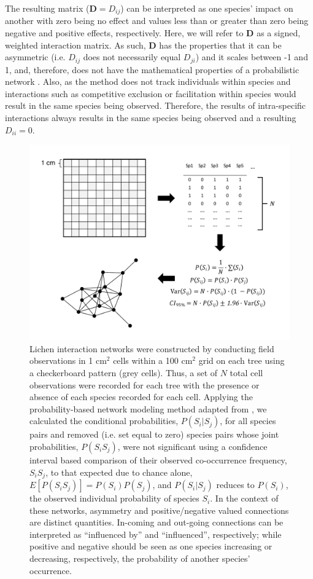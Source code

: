 \documentclass[11pt,twocolumn,twoside,lineno]{pnas-new}
\begin{document}
{The resulting matrix ($\mathbf{D} = D_{ij}$) can be interpreted as one
species' impact on another with zero being no effect and values less
than or greater than zero being negative and positive effects,
respectively. Here, we will refer to $\mathbf{D}$ as a signed,
weighted interaction matrix. As such, $\mathbf{D}$ has the properties
that it can be asymmetric (i.e. $D_{ij}$ does not necessarily equal
$D_{ji}$) and it scales between -1 and 1, and, therefore, does not
have the mathematical properties of a probabilistic network
\cite{Poisot2015}. Also, as the method does not track individuals
within species and interactions such as competitive exclusion or
facilitation within species would result in the same species being
observed. Therefore, the results of intra-specific interactions always
results in the same species being observed and a resulting $D_{ii} =
0$.

\begin{figure}[ht]
\centering
\includegraphics[width=\linewidth]{lcn_araujo_method.pdf}
\caption{Lichen interaction networks were constructed by conducting
  field observations in 1 cm$^2$ cells within a 100 cm$^2$ grid on each
  tree using a checkerboard pattern (grey cells). Thus, a set of $N$
  total cell observations were recorded for each tree with the
  presence or absence of each species recorded for each cell. Applying
  the probability-based network modeling method adapted from
  \cite{Araujo2011}, we calculated the conditional probabilities,
  $P(S_i|S_j)$, for all species pairs and removed (i.e. set equal to
  zero) species pairs whose joint probabilities, $P(S_i S_j)$, were
  not significant using a confidence interval based comparison of
  their observed co-occurrence frequency, $S_iS_j$, to that expected
  due to chance alone, $E[P(S_iS_j)] = P(S_i) P(S_j)$, and
  $P(S_i|S_j)$ reduces to $P(S_i)$, the observed individual
  probability of species $S_i$. In the context of these networks,
  asymmetry and positive/negative valued connections are distinct
  quantities. In-coming and out-going connections can be interpreted
  as ``influenced by'' and ``influenced'', respectively; while
  positive and negative should be seen as one species increasing or
  decreasing, respectively, the probability of another species'
  occurrence.}
\label{fig:conet_method}
\end{figure}


}
\end{document}
